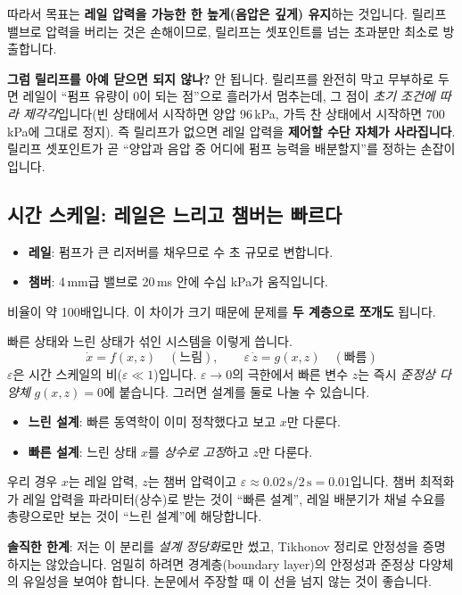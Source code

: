 \documentclass[11pt]{article}
\begin{document}
\begin{keybox}
따라서 목표는 \textbf{레일 압력을 가능한 한 높게(음압은 깊게) 유지}하는 것입니다.
릴리프 밸브로 압력을 버리는 것은 손해이므로, 릴리프는 셋포인트를 넘는 초과분만
최소로 방출합니다.
\end{keybox}

\begin{pitfall}
\textbf{그럼 릴리프를 아예 닫으면 되지 않나?} 안 됩니다. 릴리프를 완전히 막고
무부하로 두면 레일이 ``펌프 유량이 0이 되는 점''으로 흘러가서 멈추는데, 그 점이
\emph{초기 조건에 따라 제각각}입니다(빈 상태에서 시작하면 양압 96\,kPa, 가득 찬
상태에서 시작하면 700\,kPa에 그대로 정지). 즉 릴리프가 없으면 레일 압력을
\textbf{제어할 수단 자체가 사라집니다}. 릴리프 셋포인트가 곧 ``양압과 음압 중
어디에 펌프 능력을 배분할지''를 정하는 손잡이입니다.
\end{pitfall}

\subsection{시간 스케일: 레일은 느리고 챔버는 빠르다}

\begin{itemize}[leftmargin=1.4em,itemsep=1pt]
\item \textbf{레일}: 펌프가 큰 리저버를 채우므로 수 초 규모로 변합니다.
\item \textbf{챔버}: 4\,mm급 밸브로 20\,ms 안에 수십 kPa가 움직입니다.
\end{itemize}
비율이 약 100배입니다. 이 차이가 크기 때문에 문제를 \textbf{두 계층으로 쪼개도}
됩니다.

\begin{tcolorbox}[colback=boxblue,colframe=blue!55!black,title={\bfseries\kosans\small 특이섭동(singular perturbation)이란},fonttitle=\bfseries]
빠른 상태와 느린 상태가 섞인 시스템을 이렇게 씁니다.
\[
\dot x=f(x,z)\quad(\text{느림}),\qquad \varepsilon\,\dot z=g(x,z)\quad(\text{빠름})
\]
$\varepsilon$은 시간 스케일의 비($\varepsilon\ll1$)입니다. $\varepsilon\to0$의
극한에서 빠른 변수 $z$는 즉시 \emph{준정상 다양체} $g(x,z)=0$에 붙습니다. 그러면 설계를
둘로 나눌 수 있습니다.
\begin{itemize}[leftmargin=1.3em,itemsep=1pt]
\item \textbf{느린 설계}: 빠른 동역학이 이미 정착했다고 보고 $x$만 다룬다.
\item \textbf{빠른 설계}: 느린 상태 $x$를 \emph{상수로 고정}하고 $z$만 다룬다.
\end{itemize}
우리 경우 $x$는 레일 압력, $z$는 챔버 압력이고
$\varepsilon\approx 0.02\,\text{s}/2\,\text{s}=0.01$입니다. 챔버 최적화가 레일 압력을
파라미터(상수)로 받는 것이 ``빠른 설계'', 레일 배분기가 채널 수요를 총량으로만 보는
것이 ``느린 설계''에 해당합니다.

\textbf{솔직한 한계}: 저는 이 분리를 \emph{설계 정당화}로만 썼고, Tikhonov 정리로
안정성을 증명하지는 않았습니다. 엄밀히 하려면 경계층(boundary layer)의 안정성과
준정상 다양체의 유일성을 보여야 합니다. 논문에서 주장할 때 이 선을 넘지 않는 것이
좋습니다.
\end{tcolorbox}
\end{document}
